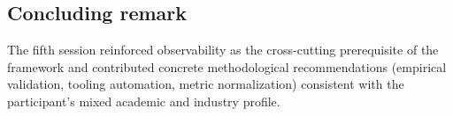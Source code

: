 \subsection*{Concluding remark}

The fifth session reinforced observability as the cross-cutting prerequisite of the framework and contributed concrete methodological recommendations (empirical validation, tooling automation, metric normalization) consistent with the participant's mixed academic and industry profile.
